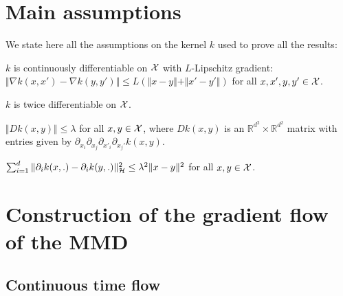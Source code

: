 \section{Main assumptions}\label{sec:assumptions_kernel}

We state here all the assumptions on the kernel $k$ used to prove all the results:%
\begin{assumplist}
	\item \label{assump:lipschitz_gradient_k} $k$ is continuously differentiable on ${{\mathcal X}}$ with $L$-Lipschitz gradient: $\Vert  \nabla k(x,x') - \nabla k(y,y')\Vert \leq L(\Vert  x-y\Vert + \Vert x'-y' \Vert ) $ for all $x,x',y,y' \in {{\mathcal X}}$.
	\item \label{assump:diff_kernel} $k$ is twice differentiable on ${{\mathcal X}}$.
	\item \label{assump:bounded_fourth_oder} $\Vert Dk(x,y) \Vert\leq \lambda  $ for all $x,y\in {{\mathcal X}}$, where $Dk(x,y)$ is an $\mathbb{R}^{d^2}\times \mathbb{R}^{d^2}$ matrix with entries given by $\partial_{x_{i}}\partial_{x_{j}}\partial_{x'_{i}}\partial_{x_{j}'}k(x,y)$.%
	\item \label{assump:Lipschitz_grad_rkhs} $ \sum_{i=1}^d\Vert  \partial_i k(x,.) - \partial_i k(y,.)\Vert^2_{{{\mathcal H}}} \leq \lambda^2 \Vert  x-y\Vert^2 $ for all $x,y\in {{\mathcal X}}$.%

\end{assumplist}

\section{Construction of the gradient flow of the MMD}\label{sec:appendix_gradient_flow}


\subsection{Continuous time flow}


%

